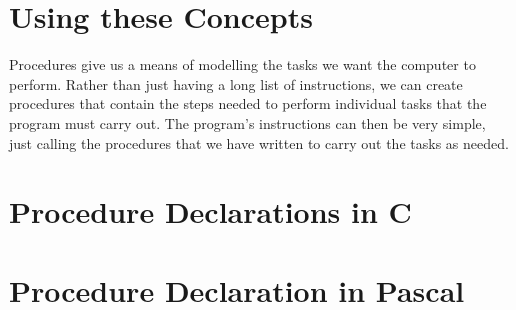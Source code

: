 





\clearpage
\section{Using these Concepts} %
\label{sec:using_these_concepts_procedure_decl}

Procedures give us a means of modelling the tasks we want the computer to perform. Rather than just having a long list of instructions, we can create procedures that contain the steps needed to perform individual tasks that the program must carry out. The program's instructions can then be very simple, just calling the procedures that we have written to carry out the tasks as needed.





\clearpage
\def\pageLang{c}
\section{Procedure Declarations in C} %
\label{sec:procedure_declaration_in_c}








\clearpage
\def\pageLang{pascal}
\section{Procedure Declaration in Pascal} %
\label{sec:procedure_declaration_in_pascal}


